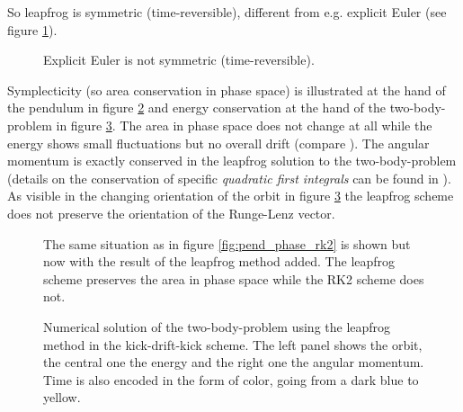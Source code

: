 So leapfrog is symmetric (time-reversible), different from e.g. explicit Euler (see figure \ref{fig:euler_symm}).

\begin{figure}[!htb]
  \centering
  \hfill
  \caption{Explicit Euler is not symmetric (time-reversible).}
  \label{fig:euler_symm}
\end{figure}



Symplecticity (so area conservation in phase space) is illustrated at the hand of the pendulum in figure \ref{fig:pend_phase_lf} and energy conservation at the hand of the two-body-problem in figure \ref{fig:leapfrog_orbit}. The area in phase space does not change at all while the energy shows small fluctuations but no overall drift (compare \cite[theorem 5.5]{hairer03}). The angular momentum is exactly conserved in the leapfrog solution to the two-body-problem (details on the conservation of specific \textit{quadratic first integrals} can be found in \cite[theorem 3.5]{hairer03}). As visible in the changing orientation of the orbit in figure \ref{fig:leapfrog_orbit} the leapfrog scheme does not preserve the orientation of the Runge-Lenz vector.

\begin{figure}[!htb]
  \centering
  \hfill
  \caption{The same situation as in figure \ref{fig:pend_phase_rk2} is shown but now with the result of the leapfrog method added. The leapfrog scheme preserves the area in phase space while the RK2 scheme does not.}
  \label{fig:pend_phase_lf}
\end{figure}

\begin{figure}[!htb]
  \centering
  \hfill
  \caption{Numerical solution of the two-body-problem using the leapfrog method in the kick-drift-kick scheme. The left panel shows the orbit, the central one the energy and the right one the angular momentum. Time is also encoded in the form of color, going from a dark blue to yellow.}
  \label{fig:leapfrog_orbit}
\end{figure}

